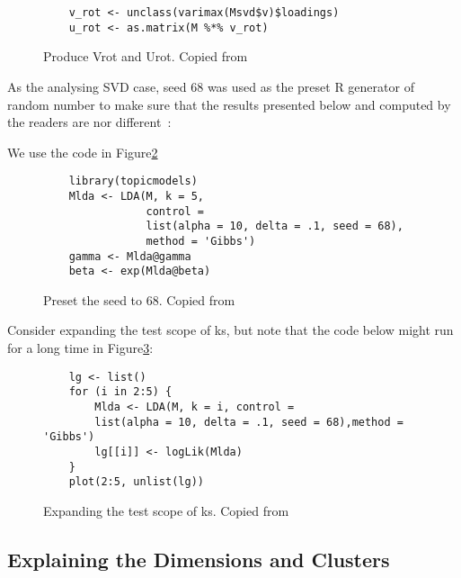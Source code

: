 \begin{figure}[htb]
\begin{footnotesize}
\begin{verbatim}
    v_rot <- unclass(varimax(Msvd$v)$loadings)
    u_rot <- as.matrix(M %*% v_rot)
\end{verbatim}
\end{footnotesize}
\caption{Produce Vrot and Urot. Copied from~\cite{hid515-12}}
\label{F:produce}
\end{figure}


As the analysing SVD case, seed 68 was used as the preset
 R generator of random number to make sure that the results 
presented below and computed by the readers are nor 
different~\cite{hid515-12}:

We use the code in Figure\ref{F:setting68}

\begin{figure}[htb]
\begin{footnotesize}
\begin{verbatim}
    library(topicmodels)
    Mlda <- LDA(M, k = 5, 
                control = 
                list(alpha = 10, delta = .1, seed = 68), 
                method = 'Gibbs')
    gamma <- Mlda@gamma
    beta <- exp(Mlda@beta)
\end{verbatim}
\end{footnotesize}
\caption{Preset the seed to 68. Copied from~\cite{hid515-12}}
\label{F:setting68}
\end{figure}


Consider expanding the test scope of ks, but note that the code 
below might run for a long time in Figure\ref{F:expanding}:

\begin{figure}[htb]
\begin{footnotesize}
\begin{verbatim}
    lg <- list()
    for (i in 2:5) {
        Mlda <- LDA(M, k = i, control =
        list(alpha = 10, delta = .1, seed = 68),method = 'Gibbs')
        lg[[i]] <- logLik(Mlda)
    }
    plot(2:5, unlist(lg))
\end{verbatim}
\end{footnotesize}
\caption{Expanding the test scope of ks. Copied from~\cite{hid515-12}}
\label{F:expanding}
\end{figure}


\subsection{Explaining the Dimensions and Clusters~\cite{hid515-12}}

